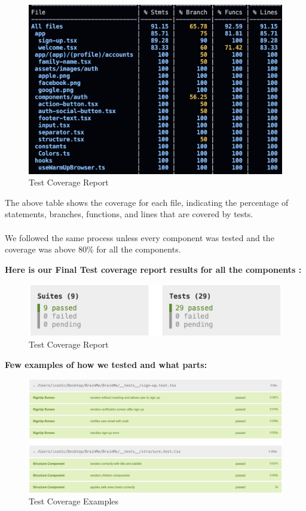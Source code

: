 \begin{figure}[H]
    \centering
    \includegraphics[width=1\linewidth, height=0.4\textheight]{Images/Coverage Report.png}
    \caption{Test Coverage Report}
\end{figure}


The above table shows the coverage for each file, indicating the percentage of statements, branches, functions, and lines that are covered by tests. \\\\
We followed the same process unless every component was tested and the coverage was above 80\% for all the components.

\vspace{1cm}

\textbf{Here is our Final Test coverage report results for all the components :}

\begin{figure}[H]
    \centering
    \includegraphics[width=1\linewidth, height=0.15\textheight]{Images/Test Results.png}
    \caption{Test Coverage Report}
\end{figure}

\textbf{Few examples of how we tested and what parts: }

\begin{figure}[H]
    \centering
    \includegraphics[width=1\linewidth, height=0.4\textheight]{Images/Test Results Example.png}
    \caption{Test Coverage Examples}
\end{figure}

